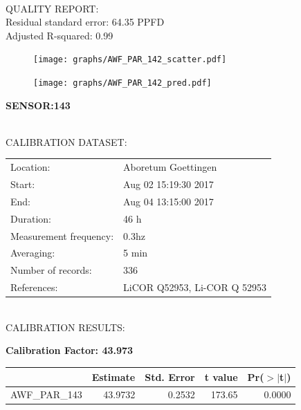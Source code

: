 \documentclass[oneside]{report}
\begin{document}
\hrulefill\\
QUALITY REPORT:\\
Residual standard error: 64.35 PPFD\\
Adjusted R-squared: 0.99



\begin{figure}[H]
  \centering
  \texttt{[image: graphs/AWF\_PAR\_142\_scatter.pdf]}
\end{figure}




\begin{figure}[H]
  \centering
  \texttt{[image: graphs/AWF\_PAR\_142\_pred.pdf]}
\end{figure}

\pagebreak


\begin{center}
\large{\textbf{SENSOR:143}}\\
\end{center}

\hrulefill\\
CALIBRATION DATASET:\\
\begin{table}[h!]
  \centering
  \label{tab:table1}
  \begin{tabular}{ll}
    Location: & Aboretum Goettingen\\ 
    
    
    Start:  & Aug 02 15:19:30 2017 \\
    End:   & Aug 04 13:15:00 2017\\ 
    Duration: & 46 h\\
    Measurement frequency: & 0.3hz\\
    Averaging:  &5 min\\
    Number of records: & 336 \\
    References: & LiCOR Q52953, Li-COR Q 52953 \\
  \end{tabular}
\end{table}

\hrulefill\\
CALIBRATION RESULTS:\\


\begin{center}
\textbf{\large{Calibration Factor: 43.973}}\\
\end{center}
\begin{table}[ht]
\centering
\begin{tabular}{rrrrr}
  \hline
 & Estimate & Std. Error & t value & Pr($>$$|$t$|$) \\ 
  \hline
AWF\_PAR\_143 & 43.9732 & 0.2532 & 173.65 & 0.0000 \\ 
   \hline
\end{tabular}
\end{table}
\end{document}

